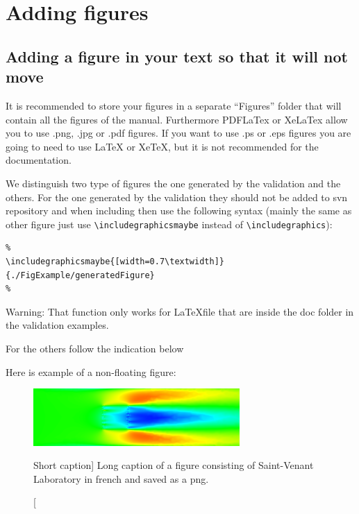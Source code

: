 \chapter{Adding figures}

\section[Short section title]{Adding a figure in your text so that it will not move}

It is recommended to store your figures in a separate ``Figures'' folder that
will contain all the figures of the manual. Furthermore PDFLaTex or XeLaTex
allow you to use .png, .jpg or .pdf figures. If you want to use .ps or .eps
figures you are going to need to use LaTeX or XeTeX, but it is not recommended
for the \telemacsystem{} documentation.

We distinguish two type of figures the one generated by the validation and the
others. For the one generated by the validation they should not be added to svn
repository and when including then use the following syntax (mainly the same as
other figure just use \verb!\includegraphicsmaybe! instead of
\verb!\includegraphics!):
\begin{verbatim}
%
\includegraphicsmaybe{[width=0.7\textwidth]}{./FigExample/generatedFigure}
%
\end{verbatim}
%
\begin{WarningBlock}{Warning:}
That function only works for \LaTeX file that are inside the doc folder in the
validation examples.
\end{WarningBlock}

For the others follow the indication below

Here is example of a non-floating figure:

\begin{figure}[H]%
\begin{center}
%
  \includegraphics[width=0.7\textwidth]{./FigExample/ExampleImage}
%
\end{center}
\caption
[Short caption]
{Long caption of a figure consisting of Saint-Venant Laboratory in french and
saved as a png\protect\footnotemark.}
\label{fig:ExampleImage}
\end{figure}

